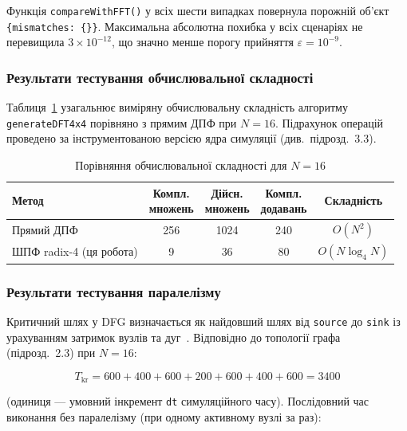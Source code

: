 Функція \texttt{compareWithFFT()} у всіх шести випадках повернула
порожній об'єкт \texttt{\{mismatches: \{\}\}}. Максимальна абсолютна
похибка у всіх сценаріях не перевищила $3 \times 10^{-12}$, що значно
менше порогу прийняття $\varepsilon = 10^{-9}$.

\subsubsection*{Результати тестування обчислювальної складності}

Таблиця~\ref{tab:complexity} узагальнює виміряну обчислювальну
складність алгоритму \texttt{generateDFT4x4} порівняно з прямим ДПФ
при $N = 16$. Підрахунок операцій проведено за інструментованою версією
ядра симуляції (див.\ підрозд.~3.3).

\begin{table}[H]
  \caption{Порівняння обчислювальної складності для $N = 16$}
  \label{tab:complexity}
  \centering
  \begin{tabular}{p{4.5cm}cccc}
    \toprule
    Метод & \makecell{Компл.\\множень} & \makecell{Дійсн.\\множень} &
            \makecell{Компл.\\додавань} & Складність \\
    \midrule
    Прямий ДПФ
      & 256 & 1024 & 240 & $O(N^2)$ \\
    ШПФ radix-4 (ця робота)
      & 9   &  36  &  80 & $O(N \log_4 N)$ \\
    \bottomrule
  \end{tabular}
\end{table}

\subsubsection*{Результати тестування паралелізму}

Критичний шлях у DFG визначається як найдовший шлях від \texttt{source}
до \texttt{sink} із урахуванням затримок вузлів та дуг~\cite{veen1986}.
Відповідно до топології графа (підрозд.~2.3) при $N = 16$:

\begin{equation}
  T_{\mathrm{kr}} = 600 + 400 + 600 + 200 + 600 + 400 + 600 = 3400
  \label{eq:critical_full}
\end{equation}

(одиниця --- умовний інкремент \texttt{dt} симуляційного часу).
Послідовний час виконання без паралелізму (при одному активному
вузлі за раз):

